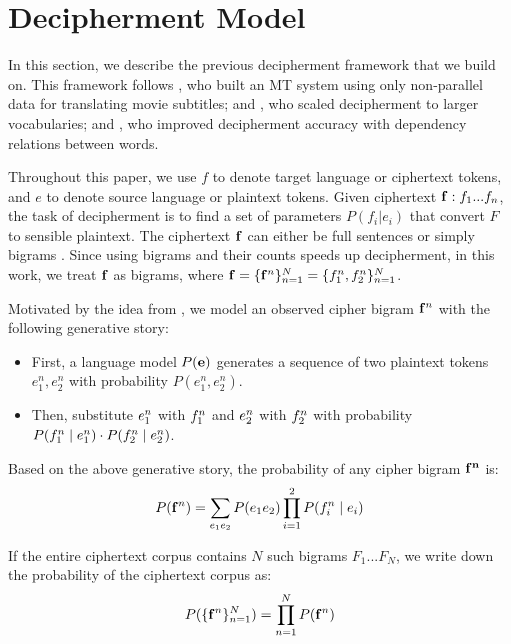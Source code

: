 \section{Decipherment Model}

In this section, we describe the previous decipherment framework that we build on.  This framework follows , who built an MT system using only non-parallel data for translating movie subtitles;  and , who scaled decipherment to larger vocabularies; and , who improved decipherment accuracy with dependency relations between words. 

Throughout this paper, we use $f$ to denote target language or ciphertext tokens, and $e$ to denote source language or plaintext tokens. Given ciphertext $\mathbf{f}:f_{1}...f_{n}$, the task of decipherment is to find a set of parameters $P(f_{i}|e_{i})$ that convert $F$ to sensible plaintext. The ciphertext $\mathbf{f}$ can either be full sentences \cite{ravi-knight:2011,Nuhn:2012} or simply bigrams \cite{dou-knight:2013:EMNLP}. Since using bigrams and their counts speeds up decipherment, in this work, we treat $\mathbf{f}$ as bigrams, where $ \mathbf{f} = \{ \mathbf{f}^n \}_{n=1}^{N} = \{ f_1^n,f_2^n \}_{n=1}^{N} $. 

Motivated by the idea from , we model an observed cipher bigram $\mathbf{f}^n$ with the following generative story:

\begin{itemize}
\item  First, a language model $P(\mathbf{e})$ generates a sequence of two plaintext tokens $e_{1}^n,e_{2}^n$ with probability $P(e_{1}^n,e_{2}^n)$.
\item  Then, substitute $e_{1}^n$ with $f_{1}^n$ and $e_{2}^n$ with $f_{2}^n$ with probability $P(f_{1}^n \mid e_{1}^n) \cdot P(f_{2}^n \mid e_{2}^n)$.
\end{itemize}

Based on the above generative story, the probability of any cipher bigram $\mathbf{f^n}$ is:
%
\[
\label{p_cipher}
P(\mathbf{f}^n) =  \sum_{e_{1} e_{2}} P(e_{1}e_{2}) \prod_{i=1}^{2}P(f_{i}^n \mid e_{i})
\]
%

If the entire ciphertext corpus contains $N$ such bigrams $F_{1}...F_{N}$, we write down the probability of the ciphertext corpus as:
%
\[
\label{p_corpus}
P( \{ \mathbf{f}^n \}_{n=1}^{N} ) =  \prod_{n=1}^{N} P(\mathbf{f}^{n})
\]
%

